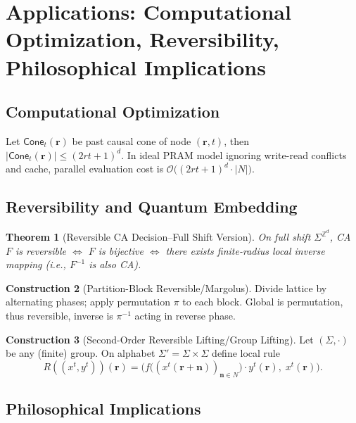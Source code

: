 \documentclass[11pt]{article}
\newtheorem{theorem}{Theorem}[section]
\theoremstyle{definition}
\newtheorem{construction}[theorem]{Construction}
\theoremstyle{remark}
\begin{document}
\section{Applications: Computational Optimization, Reversibility, Philosophical Implications}\label{sec:applications}

\subsection{Computational Optimization}

Let \( \mathsf{Cone}_t(\mathbf r) \) be past causal cone of node \( (\mathbf r,t) \), then \( |\mathsf{Cone}_t(\mathbf r)|\le (2 r t+1)^d \). In ideal PRAM model ignoring write-read conflicts and cache, parallel evaluation cost is \( \mathcal O\big((2 r t+1)^d \cdot |N|\big) \).

\subsection{Reversibility and Quantum Embedding}

\begin{theorem}[Reversible CA Decision--Full Shift Version]\label{thm:reversible}
On full shift \( \Sigma^{\mathbb Z^d} \), CA \( F \) is reversible \( \Longleftrightarrow \) \( F \) is bijective \( \Longleftrightarrow \) there exists finite-radius local inverse mapping (i.e., \( F^{-1} \) is also CA).
\end{theorem}

\begin{construction}[Partition-Block Reversible/Margolus]\label{constr:margolus}
Divide lattice by alternating phases; apply permutation \( \pi \) to each block. Global is permutation, thus reversible, inverse is \( \pi^{-1} \) acting in reverse phase.
\end{construction}

\begin{construction}[Second-Order Reversible Lifting/Group Lifting]\label{constr:group}
Let \( (\Sigma,\cdot) \) be any (finite) group. On alphabet \( \Sigma'=\Sigma\times\Sigma \) define local rule
\[
R\!\left((x^t,y^t)\right)(\mathbf r)
=\Big(
  f\big((x^t(\mathbf r+\mathbf n))_{\mathbf n\in N}\big)\cdot y^t(\mathbf r),\;
  x^t(\mathbf r)
\Big).
\]
\end{construction}

\subsection{Philosophical Implications}
\end{document}
